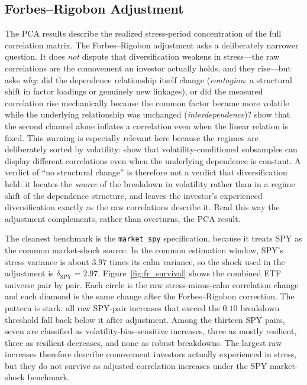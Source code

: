 \subsection{Forbes--Rigobon Adjustment}
\label{subsec:results_forbes_rigobon}

The PCA results describe the realized stress-period concentration of the full correlation matrix. The Forbes--Rigobon adjustment asks a deliberately narrower question. It does \emph{not} dispute that diversification weakens in stress---the raw correlations are the comovement an investor actually holds, and they rise---but asks \emph{why}: did the dependence relationship itself change (\emph{contagion}: a structural shift in factor loadings or genuinely new linkages), or did the measured correlation rise mechanically because the common factor became more volatile while the underlying relationship was unchanged (\emph{interdependence})? \citet{forbesrigobon2002} show that the second channel alone inflates a correlation even when the linear relation is fixed. This warning is especially relevant here because the regimes are deliberately sorted by volatility: \citet{boyer1999pitfalls} show that volatility-conditioned subsamples can display different correlations even when the underlying dependence is constant. A verdict of ``no structural change'' is therefore not a verdict that diversification held: it locates the \emph{source} of the breakdown in volatility rather than in a regime shift of the dependence structure, and leaves the investor's experienced diversification exactly as the raw correlations describe it. Read this way the adjustment complements, rather than overturns, the PCA result.

The cleanest benchmark is the \texttt{market\_spy} specification, because it treats SPY as the common market-shock source. In the common estimation window, SPY's stress variance is about $3.97$ times its calm variance, so the shock used in the adjustment is $\delta_{\mathrm{SPY}} = 2.97$. Figure~\ref{fig:fr_survival} shows the combined ETF universe pair by pair. Each circle is the raw stress-minus-calm correlation change and each diamond is the same change after the Forbes--Rigobon correction. The pattern is stark: all raw SPY-pair increases that exceed the $0.10$ breakdown threshold fall back below it after adjustment. Among the thirteen SPY pairs, seven are classified as volatility-bias-sensitive increases, three as mostly resilient, three as resilient decreases, and none as robust breakdowns. The largest raw increases therefore describe comovement investors actually experienced in stress, but they do not survive as adjusted correlation increases under the SPY market-shock benchmark.

